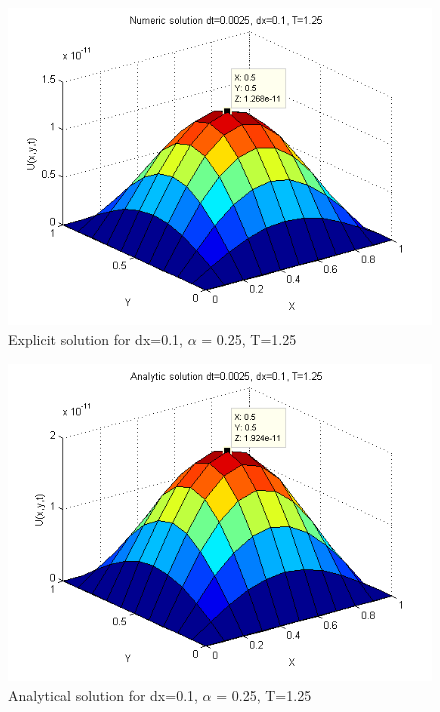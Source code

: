 \documentclass[a4paper,10pt]{article}
\begin{document}
{\begin{figure}
  \begin{center}
    \includegraphics[scale=0.5]{num_dt00025_dx01_T125}
    \caption{Explicit solution for dx=0.1, $\alpha$ = 0.25, T=1.25}
    \label{fig:Num_dx0.1_dt0.0025T2}
  \end{center}
\end{figure}

\begin{figure}
  \begin{center}
    \includegraphics[scale=0.5]{ana_dt00025_dx01_T125}
    \caption{Analytical solution for dx=0.1, $\alpha$ = 0.25, T=1.25}
    \label{fig:Ana_dx0.1_dt0.0025T2}
  \end{center}
\end{figure}

}
\end{document}
